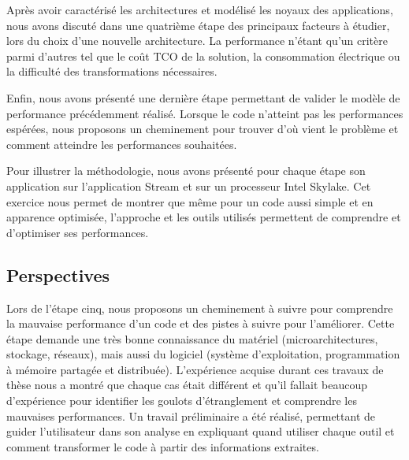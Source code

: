     Après avoir caractérisé les architectures et modélisé les noyaux des applications, nous avons discuté dans une quatrième étape des principaux facteurs à étudier, lors du choix d'une nouvelle architecture. La performance n'étant qu'un critère parmi d'autres tel que le coût TCO de la solution, la consommation électrique ou la difficulté des transformations nécessaires.
    
    Enfin, nous avons présenté une dernière étape permettant de valider le modèle de performance précédemment réalisé. Lorsque le code n'atteint pas les performances espérées, nous proposons un cheminement pour trouver d'où vient le problème et comment atteindre les performances souhaitées. 
    
    Pour illustrer la méthodologie, nous avons présenté pour chaque étape son application sur l'application Stream et sur un processeur Intel Skylake. Cet exercice nous permet de montrer que même pour un code aussi simple et en apparence optimisée, l'approche et les outils utilisés permettent de comprendre et d'optimiser ses performances.
    
    
    

\subsection{Perspectives}

    Lors de l'étape cinq, nous proposons un cheminement à suivre pour comprendre la mauvaise performance d'un code et des pistes à suivre pour l'améliorer. Cette étape demande une très bonne connaissance du matériel (microarchitectures, stockage, réseaux), mais aussi du logiciel (système d'exploitation, programmation à mémoire partagée et distribuée). L'expérience acquise durant ces travaux de thèse nous a montré que chaque cas était différent et qu'il fallait beaucoup d'expérience pour identifier les goulots d'étranglement et comprendre les mauvaises performances. Un travail préliminaire a été réalisé, permettant de guider l'utilisateur dans son analyse en expliquant quand utiliser chaque outil et comment transformer le code à partir des informations extraites.
    
    

